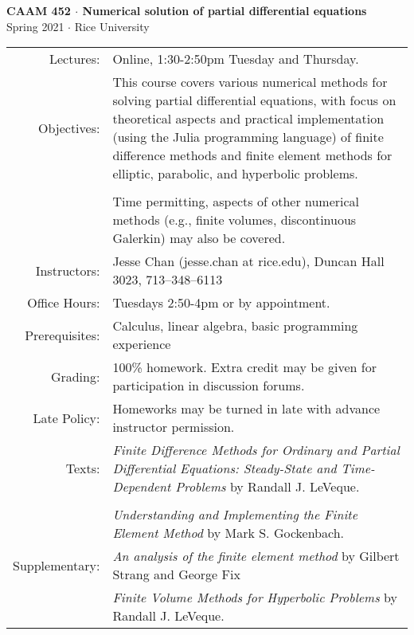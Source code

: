 \documentclass[11pt]{article}
\begin{document}
\begin{center}
\large \textsf{\textbf{CAAM 452 $\cdot$ Numerical solution of partial differential equations}\\[0.5em]
Spring 2021 $\cdot$ Rice University}
\end{center}

\hspace*{-4em}
\begin{tabular}[b]{rp{35em}}

Lectures:		& Online, 1:30-2:50pm Tuesday and Thursday. \\[1em]

Objectives: 	& This course covers various numerical methods for solving partial differential equations, with focus on theoretical aspects and practical implementation (using the Julia programming language) of finite difference methods and finite element methods for elliptic, parabolic, and hyperbolic problems.\\ \\
			& Time permitting, aspects of other numerical methods (e.g., finite volumes, discontinuous Galerkin) may also be covered.\\[1em]

Instructors:  	 & Jesse Chan (jesse.chan at rice.edu), Duncan Hall 3023, 713--348--6113\\[1em]

Office Hours:	 & Tuesdays 2:50-4pm or by appointment.\\[1em]
               
Prerequisites:	 & Calculus, linear algebra, basic programming experience \\[1em]                           

Grading:		 & 100\% homework. Extra credit may be given for participation in discussion forums. \\[1em]

Late Policy:	 & Homeworks may be turned in late with advance instructor permission.\\[1em]

Texts:	  	 & \emph{Finite Difference Methods for Ordinary and Partial Differential Equations: Steady-State and Time-Dependent Problems}  by Randall J. LeVeque.\\ \\
			 & \emph{Understanding and Implementing the Finite Element Method}  by Mark S. Gockenbach. \\[1em] 

Supplementary: & \emph{An analysis of the finite element method} by Gilbert Strang and George Fix\\
			 & \emph{Finite Volume Methods for Hyperbolic Problems} by Randall J. LeVeque.\\[1em]
\end{tabular}
\end{document}
